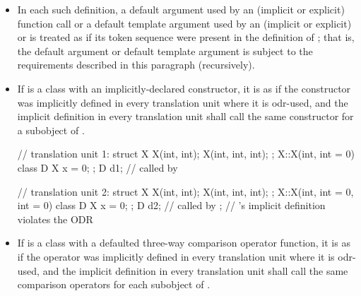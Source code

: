 \begin{itemize}
\item In each such definition,
a default argument used by an (implicit or explicit) function call or
a default template argument used by an (implicit or explicit)
 or 
is treated as if its token sequence
were present in the definition of ;
that is, the default argument or default template argument
is subject to the requirements described in this paragraph (recursively).

\item If  is a class with an implicitly-declared
constructor,
it is as if the constructor was
implicitly defined in every translation unit where it is odr-used, and the
implicit definition in every translation unit shall call the same
constructor for a subobject of .
\begin{example}
\begin{codeblock}
// translation unit 1:
struct X {
  X(int, int);
  X(int, int, int);
};
X::X(int, int = 0) { }
class D {
  X x = 0;
};
D d1;                           //  called by 

// translation unit 2:
struct X {
  X(int, int);
  X(int, int, int);
};
X::X(int, int = 0, int = 0) { }
class D {
  X x = 0;
};
D d2;                           //  called by ;
                                // 's implicit definition violates the ODR
\end{codeblock}
\end{example}

\item If  is a class with
a defaulted three-way comparison operator function,
it is as if the operator was
implicitly defined in every translation unit where it is odr-used, and the
implicit definition in every translation unit shall call the same
comparison operators for each subobject of .
\end{itemize}


